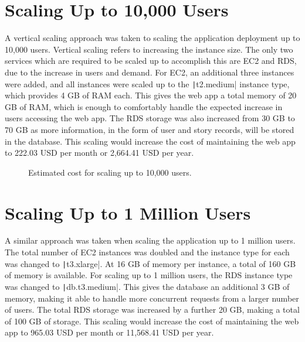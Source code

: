 \clearpage
\section{Scaling Up to 10,000 Users}\label{sec:scaling-up-to-10000-users}
A vertical scaling approach was taken to scaling the application deployment up to 10,000 users.
Vertical scaling refers to increasing the instance size.
The only two services which are required to be scaled up to accomplish this are EC2 and RDS, due to the increase
in users and demand.
For EC2, an additional three instances were added, and all instances were scaled up to the \texttt|t2.medium|
instance type, which provides 4 GB of RAM each.
This gives the web app a total memory of 20 GB of RAM, which is enough to comfortably handle the expected
increase in users accessing the web app.
The RDS storage was also increased from 30 GB to 70 GB as more information, in the form of user and story records,
will be stored in the database.
This scaling would increase the cost of maintaining the web app to 222.03 USD per month or 2,664.41 USD per year.

\begin{figure}[!htbp]
    \centering
    \hfill
    \caption{Estimated cost for scaling up to 10,000 users.}
    \label{fig:10,000-users}
\end{figure}

\clearpage
\section{Scaling Up to 1 Million Users}\label{sec:scaling-up-to-1-million-users}
A similar approach was taken when scaling the application up to 1 million users.
The total number of EC2 instances was doubled and the instance type for each was changed to
\texttt|t3.xlarge|.
At 16 GB of memory per instance, a total of 160 GB of memory is available.
For scaling up to 1 million users, the RDS instance type was changed to \texttt|db.t3.medium|.
This gives the database an additional 3 GB of memory, making it able to handle more concurrent
requests from a larger number of users.
The total RDS storage was increased by a further 20 GB, making a total of 100 GB of storage.
This scaling would increase the cost of maintaining the web app to 965.03 USD per month or 11,568.41 USD per year.

